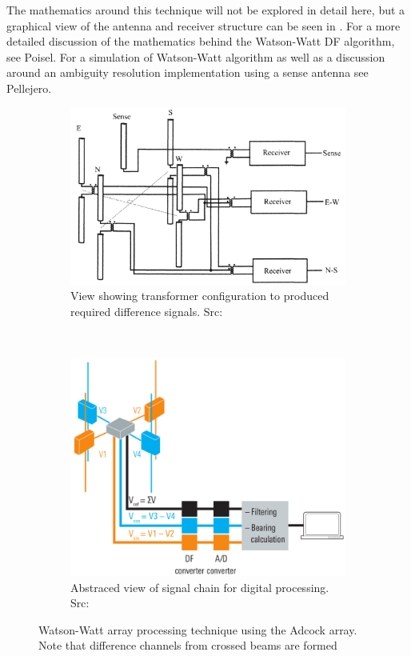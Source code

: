 The mathematics around this technique will not be explored in detail here, but a graphical view of the antenna and receiver structure can be seen in .
For a more detailed discussion of the mathematics behind the Watson-Watt DF algorithm, see Poisel\cite{poisel2008introduction}.
For a simulation of Watson-Watt algorithm as well as a discussion around an ambiguity resolution implementation using a sense antenna see Pellejero\cite{adcockwatsonwattrdf}.

\begin{figure}
  \centering
  \begin{subfigure}[b]{0.48\textwidth}
    \includegraphics[width=\textwidth]{./img/lit_review/watson-watt-processing-analogue}
    \caption{View showing transformer configuration to produced required difference signals. Src: \cite{poisel2008introduction}}
  \end{subfigure}
  ~
  \begin{subfigure}[b]{0.48\textwidth}
    \includegraphics[width=\textwidth]{./img/lit_review/watson-watt-processing-digital}
    \caption{Abstraced view of signal chain for digital processing. Src: \cite{rhode2000introtodf}}
  \end{subfigure}
  \caption{Watson-Watt array processing technique using the Adcock array. Note that difference channels from crossed beams are formed}
  \label{fig:watson-watt}
\end{figure}

